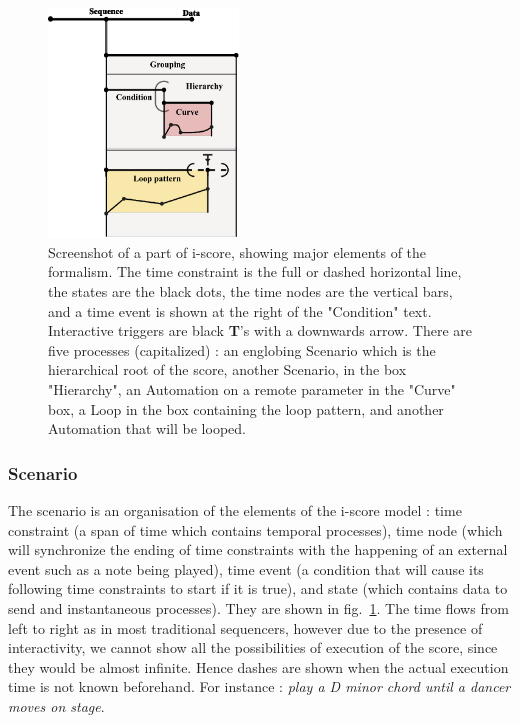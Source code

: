 \documentclass{article}
\begin{document}
\begin{figure}
    \centering
    \includegraphics[width=0.45\textwidth]{images/hierarchy.eps}
    \caption{Screenshot of a part of i-score, showing major elements of the formalism. The time constraint is the full or dashed horizontal line, the states are the black dots, the time nodes are the vertical bars, and a time event is shown at the right of the "Condition" text. Interactive triggers are black \textbf{T}'s with a downwards arrow. There are five processes (capitalized) : an englobing Scenario which is the hierarchical root of the score, another Scenario, in the box "Hierarchy", an Automation on a remote parameter in the "Curve" box, a Loop in the box containing the loop pattern, and another Automation that will be looped.}
    \label{fig.hierarchy}
\end{figure}
\subsubsection{Scenario}
The scenario is an organisation of the elements of the i-score model : time constraint (a span of time which contains temporal processes), time node (which will synchronize the ending of time constraints with the happening of an external event such as a note being played), time event (a condition that will cause its following time constraints to start if it is true), and state (which contains data to send and instantaneous processes).
They are shown in fig.~\ref{fig.hierarchy}. 
The time flows from left to right as in most traditional sequencers, however due to the presence of interactivity, we cannot show all the possibilities of execution of the score, since they would be almost infinite. 
Hence dashes are shown when the actual execution time is not known beforehand. 
For instance : \emph{play a D minor chord until a dancer moves on stage}.
\end{document}
